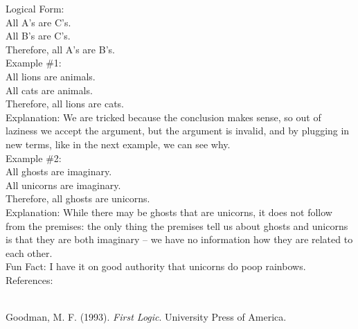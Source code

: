 \documentclass[a4paper,12pt,single,pdftex]{scrartcl}
\begin{document}
    
      Logical Form:
    \\

    
      All A's are C's.
    \\

    
      All B's are C's.
    \\

    
      Therefore, all A’s are B’s.
    \\

    
      Example \#1:
    \\

    
      All lions are animals.
    \\

    
      All cats are animals.
    \\

    
      Therefore, all lions are cats.
    \\

    
      Explanation: We are tricked because the conclusion makes sense, so out of laziness we accept the argument, but the argument is invalid, and by plugging in new terms, like in the next example, we can see why.
    \\

    
      Example \#2:
    \\

    
      All ghosts are imaginary.
    \\

    
      All unicorns are imaginary.
    \\

    
      Therefore, all ghosts are unicorns.
    \\

    
      Explanation: While there may be ghosts that are unicorns, it does not follow from the premises: the only thing the premises tell us about ghosts and unicorns is that they are both imaginary -- we have no information how they are related to each other.
    \\

    
      Fun Fact: I have it on good authority that unicorns do poop rainbows.
    \\

    References:

    
      
        
      \\

      
        
          Goodman, M. F. (1993). {\it First Logic}. University Press of America.
        
\end{document}
